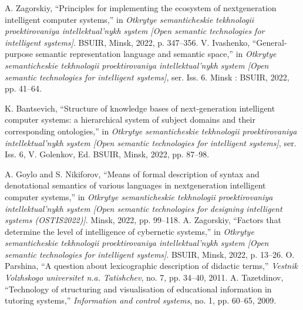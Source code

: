 \documentclass[a4paper]{article}
\begin{document}
\begin{multicols}{2}
\begin{center}
\begin{thebibliography}{46}
     A. Zagorskiy, “Principles for implementing the ecosystem of nextgeneration intelligent computer systems,” in \textit{Otkrytye semanticheskie tekhnologii proektirovaniya intellektual’nykh system [Open
semantic technologies for intelligent systems]}. BSUIR, Minsk,
2022, p. 347–356.
   V. Ivashenko, “General-purpose semantic representation language
and semantic space,” in \textit{Otkrytye semanticheskie tekhnologii
proektirovaniya intellektual’nykh system [Open semantic technologies for intelligent systems]}, ser. Iss. 6. Minsk : BSUIR, 2022,
pp. 41–64.

    K. Bantsevich, “Structure of knowledge bases of next-generation
intelligent computer systems: a hierarchical system of subject
domains and their corresponding ontologies,” in \textit{Otkrytye semanticheskie tekhnologii proektirovaniya intellektual’nykh system
[Open semantic technologies for intelligent systems]}, ser. Iss. 6,
V. Golenkov, Ed. BSUIR, Minsk, 2022, pp. 87–98.


     A. Goylo and S. Nikiforov, “Means of formal description of
syntax and denotational semantics of various languages in nextgeneration intelligent computer systems,” in \textit{Otkrytye semanticheskie tekhnologii proektirovaniya intellektual’nykh system [Open
semantic technologies for designing intelligent systems (OSTIS2022)]}. Minsk, 2022, pp. 99–118.
    A. Zagorskiy, “Factors that determine the level of intelligence of
cybernetic systems,” in \textit{Otkrytye semanticheskie tekhnologii proektirovaniya intellektual’nykh system [Open semantic technologies
for intelligent systems]}. BSUIR, Minsk, 2022, p. 13–26.
    O. Parshina, “A question about lexicographic description of
didactic terms,” \textit{Vestnik Volzhskogo universitet n.a. Tatishchev},
no. 7, pp. 34–40, 2011.
     A. Tazetdinov, “Technology of structuring and visualisation of
educational information in tutoring systems,” \textit{Information and
control systems}, no. 1, pp. 60–65, 2009.
\end{thebibliography}
\end{center}
\begin{otherlanguage}{russian}
    \fontsize{10}{15}\selectfont
\begin{center}

\end{center}
\end{otherlanguage}
\end{multicols}
\end{document}
